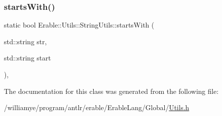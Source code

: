 \subsubsection{\texorpdfstring{startsWith()}{startsWith()}}
{\footnotesize\ttfamily static bool Erable\+::\+Utils\+::\+String\+Utils\+::starts\+With (\begin{DoxyParamCaption}\item[{std\+::string}]{str,  }\item[{std\+::string}]{start }\end{DoxyParamCaption})\hspace{0.3cm}{\ttfamily [inline]}, {\ttfamily [static]}}



The documentation for this class was generated from the following file\+:\begin{DoxyCompactItemize}
\item 
/williamye/program/antlr/erable/\+Erable\+Lang/\+Global/\mbox{\hyperlink{_utils_8h}{Utils.\+h}}\end{DoxyCompactItemize}
